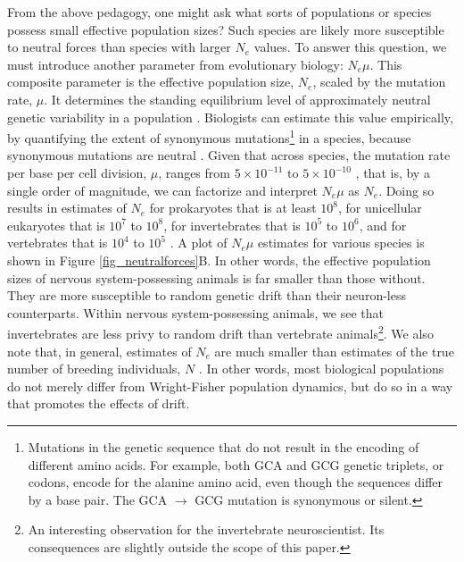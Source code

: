 \documentclass[twocolumn]{article}
\begin{document}
From the above pedagogy, one might ask what sorts of populations or species possess small effective population sizes? Such species are likely more susceptible to neutral forces than species with larger $N_e$ values. To answer this question, we must introduce another parameter from evolutionary biology: $N_e \mu$. This composite parameter is the effective population size, $N_e$, scaled by the mutation rate, $\mu$. It determines the standing equilibrium level of approximately neutral genetic variability in a population \cite{kimura1983neutral, Lynch_Conery_2003, charlesworth_2009}. Biologists can estimate this value empirically, by quantifying the extent of synonymous mutations\footnote{Mutations in the genetic sequence that do not result in the encoding of different amino acids. For example, both GCA and GCG genetic triplets, or codons, encode for the alanine amino acid, even though the sequences differ by a base pair. The GCA $\rightarrow$ GCG mutation is synonymous or silent.} in a species, because synonymous mutations are neutral \cite{Lynch_Conery_2003}. Given that across species, the mutation rate per base per cell division, $\mu$, ranges from $5\times 10^{-11} \text{ to } 5\times10^{-10}$ \cite{drake_1998}, that is, by a single order of magnitude, we can factorize and interpret $N_e\mu$ as $N_e$. Doing so results in estimates of $N_e$ for prokaryotes that is at least $10^8$, for unicellular eukaryotes that is $10^7$ to $10^8$, for invertebrates that is $10^5$ to $10^6$, and for vertebrates that is $10^4$ to $10^5$ \cite{Lynch_Conery_2003}. A plot of $N_e\mu$ estimates for various species is shown in Figure \ref{fig_neutralforces}B. In other words, the effective population sizes of nervous system-possessing animals is far smaller than those without. They are more susceptible to random genetic drift than their neuron-less counterparts. Within nervous system-possessing animals, we see that invertebrates are less privy to random drift than vertebrate animals\footnote{An interesting observation for the invertebrate neuroscientist. Its consequences are slightly outside the scope of this paper.}. We also note that, in general, estimates of $N_e$ are much smaller than estimates of the true number of breeding individuals, $N$ \cite{lynch2007origins, crow_newton_1955, frankham_1995}. In other words, most biological populations do not merely differ from Wright-Fisher population dynamics, but do so in a way that promotes the effects of drift. 
\end{document}

